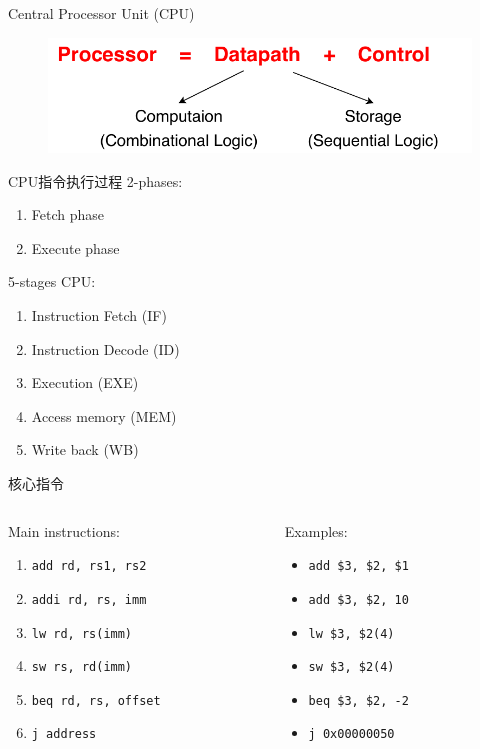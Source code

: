 \documentclass[UTF8]{ctexbeamer}
\begin{document}
\begin{frame}{Central Processor Unit (CPU)}
\begin{figure}
\centering
\includegraphics[width=0.8\linewidth]{fig/Lecture2/Abstraction-Processor.pdf}
\end{figure}
\end{frame}

\begin{frame}{CPU指令执行过程}
2-phases:
\begin{enumerate}
	\item Fetch phase
	\item Execute phase
\end{enumerate}
5-stages CPU:
\begin{enumerate}
	\item Instruction Fetch (IF)
	\item Instruction Decode (ID)
	\item Execution (EXE)
	\item Access memory (MEM)
	\item Write back (WB)
\end{enumerate}
\end{frame}

\begin{frame}[fragile]{核心指令}
\begin{columns}
\begin{column}{0.5\linewidth}
Main instructions:
\begin{enumerate}
	\item \verb'add rd, rs1, rs2'
	\item \verb'addi rd, rs, imm'
	\item \verb'lw rd, rs(imm)'
	\item \verb'sw rs, rd(imm)'
	\item \verb'beq rd, rs, offset'
	\item \verb'j address'
\end{enumerate}
\end{column}
\begin{column}{0.5\linewidth}
Examples:
\begin{itemize}
	\item \verb'add $3, $2, $1'
	\item \verb'add $3, $2, 10'
	\item \verb'lw $3, $2(4)'
	\item \verb'sw $3, $2(4)'
	\item \verb'beq $3, $2, -2'
	\item \verb'j 0x00000050'
\end{itemize}
\end{column}
\end{columns}
\end{frame}
\end{document}
